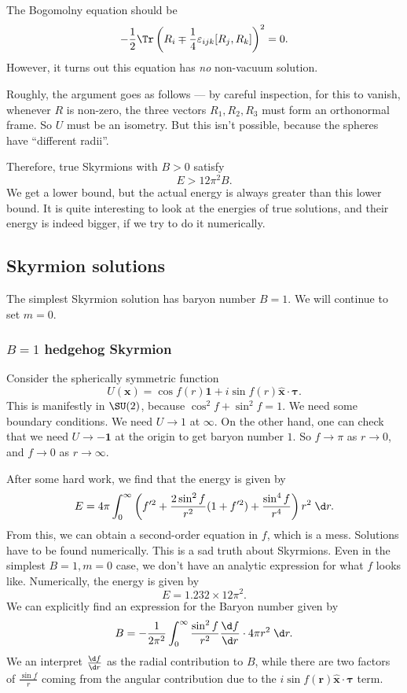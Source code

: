 \documentclass[a4paper]{article}
\begin{document}
The Bogomolny equation should be
\[
  - \frac{1}{2} \Tr\left(R_i \mp \frac{1}{4} \varepsilon_{ijk} [R_j, R_k]\right)^2 = 0.
\]
However, it turns out this equation has \emph{no} non-vacuum solution.

Roughly, the argument goes as follows --- by careful inspection, for this to vanish, whenever $R$ is non-zero, the three vectors $R_1, R_2, R_3$ must form an orthonormal frame. So $U$ must be an isometry. But this isn't possible, because the spheres have ``different radii''.

Therefore, true Skyrmions with $B > 0$ satisfy
\[
  E > 12 \pi^2 B.
\]
We get a lower bound, but the actual energy is always greater than this lower bound. It is quite interesting to look at the energies of true solutions, and their energy is indeed bigger, if we try to do it numerically.

\subsection{Skyrmion solutions}
The simplest Skyrmion solution has baryon number $B = 1$. We will continue to set $m = 0$.
\subsubsection*{$B = 1$ hedgehog Skyrmion}
Consider the spherically symmetric function
\[
  U(\mathbf{x}) = \cos f(r) \mathbf{1} + i \sin f(r) \hat{\mathbf{x}} \cdot \boldsymbol\tau.
\]
This is manifestly in $\SU(2)$, because $\cos^2 f + \sin^2 f = 1$. We need some boundary conditions. We need $U \to 1$ at $\infty$. On the other hand, one can check that we need $U \to -\mathbf{1}$ at the origin to get baryon number $1$. So $f \to \pi$ as $r \to 0$, and $f \to 0$ as $r \to \infty$. %

After some hard work, we find that the energy is given by
\[
  E = 4\pi \int_0^\infty \left(f'^2 + \frac{2 \sin^2 f}{r^2}(1 + f'^2) + \frac{\sin^4 f}{r^4}\right) r^2\;\d r.
\]
From this, we can obtain a second-order equation in $f$, which is a mess. Solutions have to be found numerically. This is a sad truth about Skyrmions. Even in the simplest $B = 1, m = 0$ case, we don't have an analytic expression for what $f$ looks like. Numerically, the energy is given by
\[
  E = 1.232 \times 12\pi^2.
\]
We can explicitly find an expression for the Baryon number given by
\[
  B = - \frac{1}{2\pi^2} \int_0^\infty \frac{\sin^2 f}{r^2} \frac{\d f}{\d r} \cdot 4\pi r^2 \;\d r.
\]
We an interpret $\frac{\d f}{\d r}$ as the radial contribution to $B$, while there are two factors of $\frac{\sin f}{r}$ coming from the angular contribution due to the $i \sin f(\mathbf{r}) \hat{\mathbf{x}} \cdot \boldsymbol\tau$ term.
\end{document}
